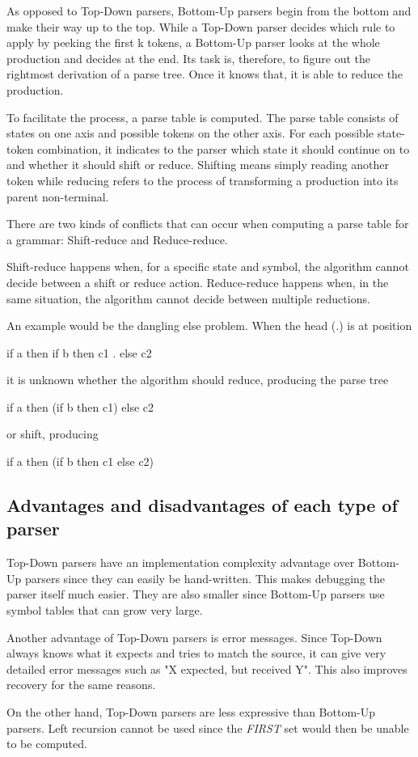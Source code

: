 As opposed to Top-Down parsers, Bottom-Up parsers begin from the bottom and make their way up to the top. While a Top-Down parser decides which rule to apply by peeking the first k tokens, a Bottom-Up parser looks at the whole production and decides at the end. Its task is, therefore, to figure out the rightmost derivation of a parse tree. Once it knows that, it is able to reduce the production.
\par
To facilitate the process, a parse table is computed. The parse table consists of states on one axis and possible tokens on the other axis. For each possible state-token combination, it indicates to the parser which state it should continue on to and whether it should shift or reduce. Shifting means simply reading another token while reducing refers to the process of transforming a production into its parent non-terminal. 
\par
There are two kinds of conflicts that can occur when computing a parse table for a grammar: Shift-reduce and Reduce-reduce. 
\par
Shift-reduce happens when, for a specific state and symbol, the algorithm cannot decide between a shift or reduce action.
Reduce-reduce happens when, in the same situation, the algorithm cannot decide between multiple reductions.
\par
An example would be the dangling else problem. When the head (.) is at position

\begin{center}
    if a then if b then c1 . else c2
\end{center}

it is unknown whether the algorithm should reduce, producing the parse tree

\begin{center}
    if a then (if b then c1) else c2
\end{center}

or shift, producing

\begin{center}
    if a then (if b then c1 else c2)
\end{center}

\subsection{Advantages and disadvantages of each type of parser}
\label{background:parser:advdisadv}

Top-Down parsers have an implementation complexity advantage over Bottom-Up parsers since they can easily be hand-written. This makes debugging the parser itself much easier. They are also smaller since Bottom-Up parsers use symbol tables that can grow very large.
\par
Another advantage of Top-Down parsers is error messages. Since Top-Down always knows what it expects and tries to match the source, it can give very detailed error messages such as "X expected, but received Y". This also improves recovery for the same reasons.
\par
On the other hand, Top-Down parsers are less expressive than Bottom-Up parsers. Left recursion cannot be used since the \textit{FIRST} set would then be unable to be computed.

